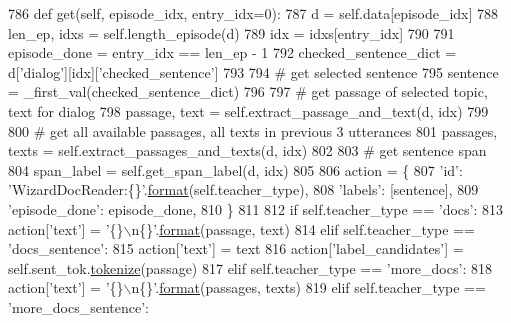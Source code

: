 \begin{DoxyCode}
786     \textcolor{keyword}{def }get(self, episode\_idx, entry\_idx=0):
787         d = self.data[episode\_idx]
788         len\_ep, idxs = self.length\_episode(d)
789         idx = idxs[entry\_idx]
790 
791         episode\_done = entry\_idx == len\_ep - 1
792         checked\_sentence\_dict = d[\textcolor{stringliteral}{'dialog'}][idx][\textcolor{stringliteral}{'checked\_sentence'}]
793 
794         \textcolor{comment}{# get selected sentence}
795         sentence = \_first\_val(checked\_sentence\_dict)
796 
797         \textcolor{comment}{# get passage of selected topic, text for dialog}
798         passage, text = self.extract\_passage\_and\_text(d, idx)
799 
800         \textcolor{comment}{# get all available passages, all texts in previous 3 utterances}
801         passages, texts = self.extract\_passages\_and\_texts(d, idx)
802 
803         \textcolor{comment}{# get sentence span}
804         span\_label = self.get\_span\_label(d, idx)
805 
806         action = \{
807             \textcolor{stringliteral}{'id'}: \textcolor{stringliteral}{'WizardDocReader:\{\}'}.\hyperlink{namespaceparlai_1_1chat__service_1_1services_1_1messenger_1_1shared__utils_a32e2e2022b824fbaf80c747160b52a76}{format}(self.teacher\_type),
808             \textcolor{stringliteral}{'labels'}: [sentence],
809             \textcolor{stringliteral}{'episode\_done'}: episode\_done,
810         \}
811 
812         \textcolor{keywordflow}{if} self.teacher\_type == \textcolor{stringliteral}{'docs'}:
813             action[\textcolor{stringliteral}{'text'}] = \textcolor{stringliteral}{'\{\}\(\backslash\)n\{\}'}.\hyperlink{namespaceparlai_1_1chat__service_1_1services_1_1messenger_1_1shared__utils_a32e2e2022b824fbaf80c747160b52a76}{format}(passage, text)
814         \textcolor{keywordflow}{elif} self.teacher\_type == \textcolor{stringliteral}{'docs\_sentence'}:
815             action[\textcolor{stringliteral}{'text'}] = text
816             action[\textcolor{stringliteral}{'label\_candidates'}] = self.sent\_tok.\hyperlink{namespaceparlai_1_1agents_1_1tfidf__retriever_1_1build__tfidf_a1fdb457e98eb4e4c26047e229686a616}{tokenize}(passage)
817         \textcolor{keywordflow}{elif} self.teacher\_type == \textcolor{stringliteral}{'more\_docs'}:
818             action[\textcolor{stringliteral}{'text'}] = \textcolor{stringliteral}{'\{\}\(\backslash\)n\{\}'}.\hyperlink{namespaceparlai_1_1chat__service_1_1services_1_1messenger_1_1shared__utils_a32e2e2022b824fbaf80c747160b52a76}{format}(passages, texts)
819         \textcolor{keywordflow}{elif} self.teacher\_type == \textcolor{stringliteral}{'more\_docs\_sentence'}:

\end{DoxyCode}
